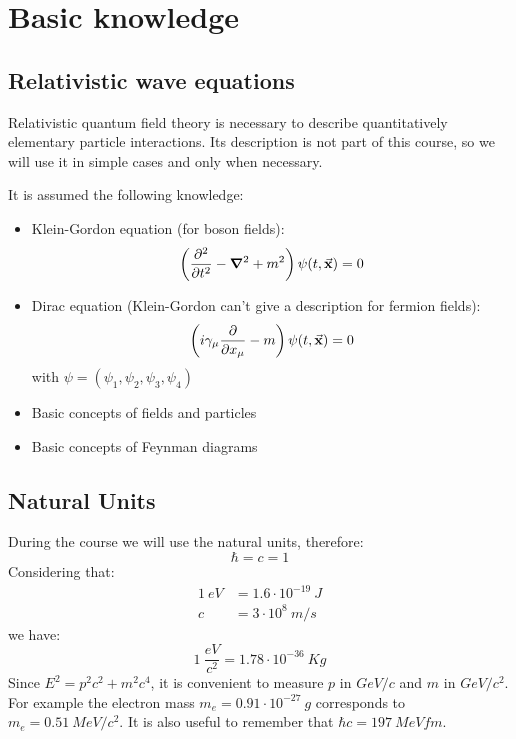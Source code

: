 \documentclass[../../main/main.tex]{subfiles}
\begin{document}
\section{Basic knowledge}

\subsection*{Relativistic wave equations}
Relativistic quantum field theory is necessary to describe quantitatively elementary particle interactions. Its description is not part of this course, so we will use it in simple cases and only when necessary.

It is assumed the following knowledge:
\begin{itemize}
    \item Klein-Gordon equation (for boson fields):
        \begin{equation}
            \left( \pdv[2]{}{t} - \grad^2 + m^2 \right) \psi (t, \va{x} ) = 0
            \label{eq:L01_KGE}
        \end{equation}

    \item Dirac equation (Klein-Gordon can't give a description for fermion fields):
        \begin{equation}
            \left( i \gamma_{\mu} \pdv{}{x_{\mu}} - m \right) \psi (t, \va{x} ) = 0
            \label{eq:L01_DE}
        \end{equation}
        with \( \psi = (\psi_1, \psi_2, \psi_3, \psi_4) \)

    \item Basic concepts of fields and particles
    \item Basic concepts of Feynman diagrams
\end{itemize}





\subsection*{Natural Units}
During the course we will use the natural units, therefore:
\begin{equation}
    \hbar = c = 1
    \label{eq:L01_NU}
\end{equation}
Considering that:
\begin{align*}
    1 \ \si{eV} &= 1.6 \cdot 10^{-19} \ \si{J} \\
    c &= 3 \cdot 10^8 \ \si{m/s}
\end{align*}
we have:
\begin{equation*}
    1 \ \frac{\si{eV}}{c^2} = 1.78 \cdot 10^{-36} \ \si{Kg}
\end{equation*}
Since \( E^2 = p^2 c^2 + m^2 c^4 \), it is convenient to measure \( p \) in \( \si{GeV/c} \) and \( m \) in \( \si{GeV/c^2} \). For example the electron mass \( m_e = 0.91 \cdot 10^{-27} \ \si{g} \) corresponds to \( m_e = 0.51 \ \si{MeV/c^2} \). It is also useful to remember that \( \hbar c = 197 \ \si{MeV fm} \).
\end{document}
